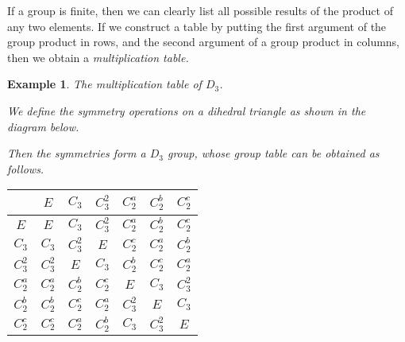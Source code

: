 \documentclass{article}
\theoremstyle{plain}\theoremheaderfont{\normalfont\itshape}\theorembodyfont{\rmfamily}\theoremseparator{.}\newtheorem*{rem}{Remark}\newtheorem*{ex}{Example}\newtheorem*{proof}{Proof}\newtheorem*{altp}{Alternative proof}
\theoremstyle{plain}\theoremheaderfont{\normalfont\bfseries}\theorembodyfont{\rmfamily}\theoremseparator{.}\newtheorem{thm}{Theorem}[section]\newtheorem{lem}[thm]{Lemma}\newtheorem{prop}[thm]{Proposition}\newtheorem*{cor}{Corollary}\newtheorem{defn}[thm]{Definition}\newtheorem{clm}[thm]{Claim}\newtheorem{clminproof}{Claim}\newtheorem*{law}{Law}\newtheorem{pos}[thm]{Postulate}
\theoremstyle{break}\theoremheaderfont{\normalfont\itshape}\theorembodyfont{\rmfamily}\theoremseparator{.\medskip}\newtheorem*{proofskip}{Proof}\newtheorem*{exs}{Examples}\newtheorem*{rems}{Remarks}
\theoremstyle{break}\theoremheaderfont{\normalfont\bfseries}\theorembodyfont{\rmfamily}\theoremseparator{.\medskip}\newtheorem{lemskip}[thm]{Lemma}\newtheorem{defnskip}[thm]{Definition}\newtheorem{propskip}[thm]{Proposition}\newtheorem{thmskip}[thm]{Theorem}
\numberwithin{equation}{section}
\begin{document}
    If a group is finite, then we can clearly list all possible results of the product of any two elements. If we construct a table by putting the first argument of the group product in rows, and the second argument of a group product in columns, then we obtain a \textit{multiplication table.}

    \begin{ex}
        \textit{The multiplication table of \(D_3\).}

        We define the symmetry operations on a dihedral triangle as shown in the diagram below.
        \begin{figure}[ht!]
            \centering
        \end{figure}

        Then the symmetries form a \(D_3\) group, whose group table can be obtained as follows.
        \begin{table}[ht!]
            \centering\renewcommand{\arraystretch}{1.3}
            \begin{tabular}{c|cccccc}
                ~ & \(E\) & \(C_3\) & \(C_3^2\) & \(C_2^a\) & \(C_2^b\) & \(C_2^c\) \\ \hline
                \(E\) & \(E\) & \(C_3\) & \(C_3^2\) & \(C_2^a\) & \(C_2^b\) & \(C_2^c\) \\
                \(C_3\) & \(C_3\) & \(C_3^2\) & \(E\) & \color{blue}\(C_2^c\) & \(C_2^a\) & \(C_2^b\) \\
                \(C_3^2\) & \(C_3^2\) & \(E\) & \(C_3\) & \(C_2^b\) & \(C_2^c\) & \(C_2^a\) \\
                \(C_2^a\) & \(C_2^a\) & \color{red}\(C_2^b\) & \(C_2^c\) & \(E\) & \(C_3\) & \(C_3^2\) \\
                \(C_2^b\) & \(C_2^b\) & \(C_2^c\) & \(C_2^a\) & \(C_3^2\) & \(E\) & \(C_3\) \\
                \(C_2^c\) & \(C_2^c\) & \(C_2^a\) & \(C_2^b\) & \(C_3\) & \(C_3^2\) & \(E\)
            \end{tabular}
        \end{table}
        

\end{ex}
\end{document}
